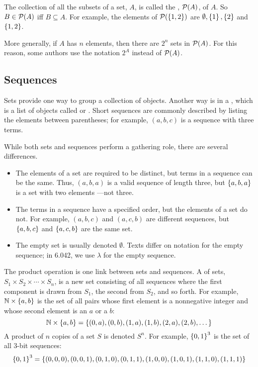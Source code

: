 The collection of all the subsets of a set, $A$, is called the
, $\mathcal{P}(A)$, of $A$.  So $B \in \mathcal{P}(A)$ iff $B \subseteq
A$.  For example, the elements of $\mathcal{P}( \left\{1, 2\right\})$ are $\emptyset,
\left\{1\right\}, \left\{2\right\}$ and $\left\{1, 2\right\}$.

More generally, if $A$ has $n$ elements, then there are $2^n$ sets in
$\mathcal{P}(A)$.  For this reason, some authors use the notation $2^A$ instead
of $\mathcal{P}(A)$.

\subsection{Sequences}

Sets provide one way to group a collection of objects.  Another way is
in a , which is a list of objects called 
or .  Short sequences are commonly described by
listing the elements between parentheses; for example, $(a, b, c)$ is
a sequence with three terms.

While both sets and sequences perform a gathering role, there are
several differences.
%
\begin{itemize}

\item The elements of a set are required to be distinct, but terms in a
sequence can be the same.  Thus, $(a, b, a)$ is a valid sequence of length
three, but $\left\{a, b, a\right\}$ is a set with two elements ---not three.

\item The terms in a sequence have a specified order, but the elements
of a set do not.  For example, $(a, b, c)$ and $(a, c, b)$ are
different sequences, but $\left\{a, b, c\right\}$ and $\left\{a, c, b\right\}$ are the
same set.

\item The empty set is usually denoted $\emptyset$.  Texts differ on
  notation for the empty sequence; in 6.042, we use $\lambda$ for the
  empty sequence.
\end{itemize}

The product operation is one link between sets and sequences.  A
 of sets, $S_1 \times S_2 \times \cdots \times S_n$, is a
new set consisting of all sequences where the first component is drawn
from $S_1$, the second from $S_2$, and so forth.  For example, $\mathbb{N}
\times \left\{a,b\right\}$ is the set of all pairs whose first element is a
nonnegative integer and whose second element is an $a$ or a $b$:
%
\[
\mathbb{N} \times \left\{a,b\right\}
    = \left\{(0,a), (0,b), (1,a), (1,b), (2,a), (2, b), \dots\right\}
\]
%
A product of $n$ copies of a set $S$ is denoted $S^n$.  For example,
$\left\{0, 1\right\}^3$ is the set of all $3$-bit sequences:
%
\[
\left\{0, 1\right\}^3 = \left\{ (0,0,0), (0,0,1), (0,1,0), (0,1,1),
                     (1,0,0), (1,0,1), (1,1,0), (1,1,1) \right\}
\]

